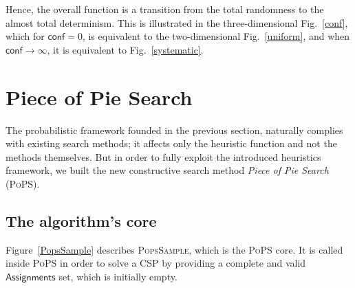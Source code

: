 \documentclass{ws-ijait}
\begin{document}
Hence, the overall function is a transition from the total
randomness to the almost total determinism. This is
illustrated in the three-dimensional Fig.~\ref{conf}, which
for $\mathsf{conf} = 0$, is equivalent to the
two-dimensional Fig.~\ref{uniform}, and when $\mathsf{conf}
\to \infty$, it is equivalent to Fig.~\ref{systematic}.


\section{Piece of Pie Search\label{PoPS}}

The probabilistic framework founded in the previous section,
naturally complies with existing search methods; it affects
only the heuristic function and not the methods themselves.
But in order to fully exploit the introduced heuristics
framework, we built the new constructive search method
\emph{Piece of Pie Search} (\textsc{PoPS}).

\subsection{The algorithm's core}

Figure~\ref{PopsSample} describes \textsc{PopsSample}, which
is the \textsc{PoPS} core. It is called inside \textsc{PoPS}
in order to solve a CSP by providing a complete and valid
$\mathsf{Assignments}$ set, which is initially empty.
\end{document}
